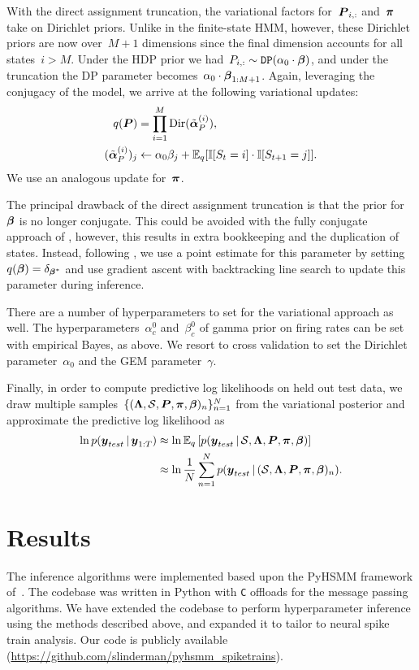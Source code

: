 With the direct assignment truncation, the variational factors
for~$\boldsymbol{P}_{i,:}$ and~$\boldsymbol{\pi}$ take on Dirichlet priors. Unlike in the
finite-state HMM, however, these Dirichlet priors are now over~${M+1}$
dimensions since the final dimension accounts for all
states~${i>M}$. Under the HDP prior we had~${P_{i,:}\sim
  \texttt{DP}(\alpha_0 \cdot \boldsymbol{\beta})}$, and under the truncation the
DP parameter becomes~$\alpha_0 \cdot \boldsymbol{\beta}_{1:M+1}$. Again,
leveraging the conjugacy of the model, we arrive at the following
variational updates:
\begin{align}
q(\boldsymbol{P}) &= \prod_{i=1}^M \mathrm{Dir}(\tilde{\boldsymbol{\alpha}}_P^{(i)}), \\
\nonumber (\tilde{\boldsymbol{\alpha}}_P^{(i)})_j &\leftarrow \alpha_0 \beta_j + \mathbb{E}_q[\mathbb{I}[S_t=i]\cdot\mathbb{I}[S_{t+1}=j]].
\end{align}
We use an analogous update for~$\boldsymbol{\pi}$.

The principal drawback of the direct assignment truncation is that the
prior for~$\boldsymbol{\beta}$ is no longer conjugate. This could be avoided with
the fully conjugate approach of \citep{Hoffman13}, however, this
results in extra bookkeeping and the duplication of states. Instead,
following \citep{Johnson14, Bryant12, Liang07}, we use a point
estimate for this parameter by setting~${q(\boldsymbol{\beta})=\delta_{\boldsymbol{\beta}^*}}$
and use gradient ascent with backtracking line search to update this
parameter during inference.

There are a number of hyperparameters to set for the variational
approach as well. The hyperparameters~$\alpha_c^0$ and~$\beta_c^0$ of
gamma prior on firing rates can be set with empirical Bayes, as
above. We resort to cross validation to set the Dirichlet
parameter~$\alpha_0$ and the GEM parameter~$\gamma$.
 

Finally, in order to compute predictive log likelihoods on held out
test data, we draw multiple samples~$\{(\boldsymbol{\Lambda}, \mathcal{S}, \boldsymbol{P},
\boldsymbol{\pi}, \boldsymbol{\beta})_n\}_{n=1}^N$ from the variational posterior and
approximate the predictive log likelihood as
\begin{align}
\ln p(\boldsymbol{y}_{test} \,|\, \boldsymbol{y}_{1:T}) &\approx \ln \mathbb{E}_q\left[p(\boldsymbol{y}_{test} \,|\, \mathcal{S}, \boldsymbol{\Lambda},  \boldsymbol{P}, \boldsymbol{\pi}, \boldsymbol{\beta})\right] \\
\nonumber &\approx \ln \frac{1}{N} \sum_{n=1}^N p(\boldsymbol{y}_{test} \,|\, (\mathcal{S}, \boldsymbol{\Lambda}, \boldsymbol{P}, \boldsymbol{\pi}, \boldsymbol{\beta})_n).
\end{align}

\section{Results}
The inference algorithms were implemented based upon the PyHSMM
framework of~\citep{Johnson14b}. The codebase was written in Python
with \texttt{C} offloads for the message passing algorithms.  We have
extended the codebase to perform hyperparameter inference using the
methods described above, and expanded it to tailor to neural spike
train analysis. Our code is publicly available
({\url{https://github.com/slinderman/pyhsmm_spiketrains}}).


